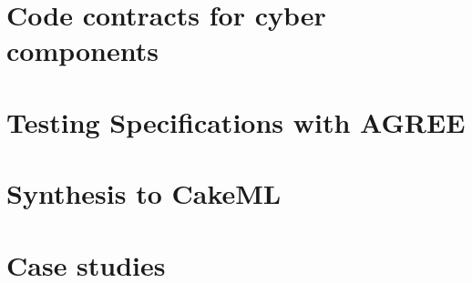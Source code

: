 \documentclass[global,twocolumn]{svjour}
\newif\ifREVISIONS
\begin{document}
\section{Code contracts for cyber components}
\label{sec:code-contracts}


\ifREVISIONS
\subsection{Revisions}
\begin{compactitem}
  \item \sout{Add in intuitive definition or AGREE leaf-component semantics}
  \item State well-formed theorem
  \item State correctness theorem or any key theorems to the synthesis proof
\end{compactitem}
\fi

\section{Testing Specifications with AGREE}
\label{sec:testing}





\section{Synthesis to CakeML}
\label{sec:synthesis}


\ifREVISIONS
\subsection{Revisions}
\begin{compactitem}
  \item State theorem relating the step function to the meaning of the leaf-node semantics
\end{compactitem}
\fi

\section{Case studies}
\label{sec:case-study}

\end{document}
